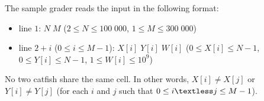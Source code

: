 \newcommand{\gt}{\textgreater} 
\newcommand{\lt}{\textless} 


The sample grader reads the input in the following format:
\begin{itemize}
    \item  line $1$: $N \; M$ ($2 \le N \le 100\;000$, $1 \le M \le 300\;000$)
    \item line $2 + i$ ($0 \le i \le M - 1$): $X[i] \; Y[i] \; W[i]$ ($0 \le X[i] \le N - 1$, $0 \le Y[i] \le N - 1$, $1 \le W[i] \le 10^9$)
\end{itemize}
No two catfish share the same cell.
  In other words, $X[i] \neq X[j]$ or $Y[i] \neq Y[j]$ (for each $i$ and $j$ such that $0 \le i \lt j \le M - 1$).
  